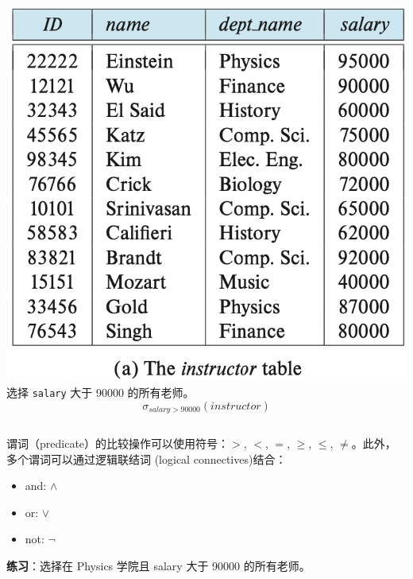 \documentclass[aspectratio=169, 14pt]{beamer}
\begin{document}
\begin{frame}

    \begin{columns}
        \includegraphics[width=\textwidth]{table/instructor}
        \alert{选择} \texttt{salary} 大于 90000 的所有老师。
        \large{\[\sigma_{salary >  90000}(instructor)\]}
    \end{columns} 

\end{frame}

\begin{frame}
谓词（predicate）的比较操作可以使用符号：$>$, $<$, $=$, $\geq$, $\leq$, $\neq$。此外，多个谓词可以通过\alert{逻辑联结词} (logical connectives)结合：

\begin{itemize}
    \item and: $\land$
    \item or: $\lor$
    \item not: $\neg$
\end{itemize}
    
\pause

{\large {}} \textbf{练习}：选择在 Physics 学院且 salary 大于 90000 的所有老师。

\end{frame}
\end{document}
